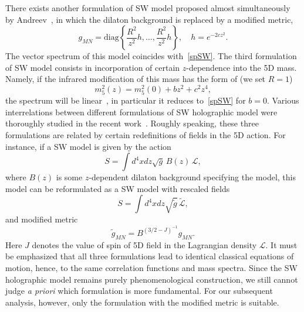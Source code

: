 \documentclass[a4paper,11pt]{article}
\begin{document}
There exists another formulation of SW model proposed almost simultaneously by Andreev~\cite{andreev}, in which the dilaton background
is replaced by a modified metric,
\begin{equation}
\label{az_metric}
  g_{MN}=\text{diag}\left\lbrace\frac{R^2}{z^2}h,\dots,\frac{R^2}{z^2}h\right\rbrace,\quad
  h=e^{-2cz^2}.
\end{equation}
The vector spectrum of this model coincides with~\eqref{spSW}.
The third formulation of SW model consists in incorporation of certain $z$-dependence into the 5D mass.
Namely, if the infrared modification of this mass has the form of (we set $R=1$)
\begin{equation}
\label{mz}
m_5^2(z)=m_5^2(0)+bz^2+c^2z^4,
\end{equation}
the spectrum will be linear~\cite{no-wall}, in particular it reduces to~\eqref{spSW} for $b=0$.
Various interrelations between different formulations of SW holographic model
were thoroughly studied in the recent work~\cite{Afonin:2021cwo}. Roughly speaking, these three formulations
are related by certain redefinitions of fields in the 5D action.
For instance, if a SW model is given by the action
\begin{equation}
\label{Bz}
  S=\int d^4x dz\sqrt{g}\,B(z)\,\mathcal{L},
\end{equation}
where $B(z)$ is some $z$-dependent dilaton background specifying the model,
this model can be reformulated as a SW model with rescaled fields
\begin{equation}
  S=\int d^4x dz\sqrt{\tilde{g}}\,\tilde{\mathcal{L}},
\end{equation}
and modified metric
\begin{equation}
\label{tr}
  \tilde{g}_{MN}=B^{(3/2-J)^{-1}}g_{MN}.
\end{equation}
Here $J$ denotes the value of spin of 5D field in the Lagrangian density $\mathcal{L}$.
It must be emphasized that all three formulations lead to identical classical equations of motion, hence,
to the same correlation functions and mass spectra. Since the SW holographic model remains purely phenomenological
construction, we still cannot judge {\it a priori} which formulation is more fundamental.
For our subsequent analysis, however, only the formulation with the modified metric is suitable.
\end{document}
